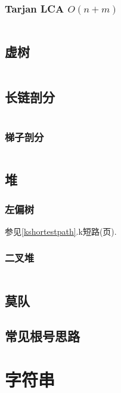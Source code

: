 \documentclass[a4paper, twoside]{article}
\begin{document}
\begin{multicols}{2}
				\subsubsection{Tarjan LCA $O(n + m)$}
					\inputminted{cpp}{../src/datastructure/tarjanlca.cpp}

			\subsection{虚树}
				\inputminted{cpp}{../src/datastructure/虚树.cpp}
	
			\subsection{长链剖分}
				\inputminted{cpp}{../src/datastructure/长链剖分.cpp}
	
				\subsubsection{梯子剖分}
					\inputminted{cpp}{../src/datastructure/梯子剖分.cpp}
			
			\subsection{堆}

				\subsubsection{左偏树}
					参见\ref{kshortestpath}.k短路(\pageref{kshortestpath}页).
				
				\subsubsection{二叉堆}
					\inputminted{cpp}{../src/datastructure/二叉堆.cpp}
			
			\subsection{莫队}
				
	
			\subsection{常见根号思路}
				

		\newpage
		\section{字符串}

\end{multicols}
\end{document}
